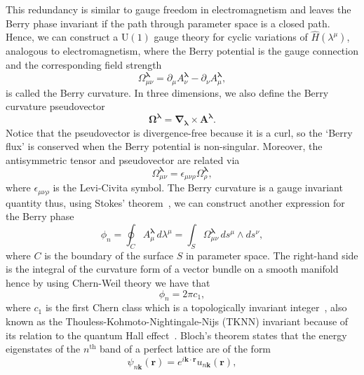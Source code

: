 \documentclass[11pt, a4paper]{article}
\begin{document}
This redundancy is similar to gauge freedom in electromagnetism and
leaves the Berry phase invariant if the path through parameter space is a closed path.
Hence, we can construct a $\mathrm{U(1)}$ gauge theory for cyclic variations of
$\widehat{H}(\lambda^\mu)$, analogous to electromagnetism,
where the Berry potential is the gauge connection and the corresponding
field strength
\begin{equation}
  \Omega^{\bm{\lambda}}_{\mu\nu} = \partial_\mu A^{\bm{\lambda}}_\nu -
  \partial_\nu A^{\bm{\lambda}}_\mu,
\end{equation}
is called the Berry curvature. In three dimensions, we also define the Berry curvature
pseudovector
\begin{equation}\label{eq:3}
  \bm{\Omega^\lambda} = \bm{\nabla_{\!\lambda}\!\times} \bm{A^\lambda}.
\end{equation}
Notice that the pseudovector is divergence-free because it is a curl, so the `Berry flux'
is conserved when the Berry potential is non-singular.
Moreover, the antisymmetric tensor and pseudovector are related via
\begin{equation}
  \Omega^{\bm{\lambda}}_{\mu\nu} = \epsilon_{\mu\nu\rho} \Omega^{\bm{\lambda}}_{\rho},
\end{equation}
where $\epsilon_{\mu\nu\rho}$ is the Levi-Civita symbol.
The Berry curvature is a gauge invariant quantity thus, using Stokes' theorem~\cite{StokesThrm},
we can construct another expression for the Berry phase
\begin{equation}
  \phi_n = \oint_C{A^{\bm{\lambda}}_\mu\,d\lambda^\mu} =
  \int_S{\Omega^{\bm{\lambda}}_{\mu\nu}\,ds^\mu\wedge ds^\nu},
\end{equation}
where $C$ is the boundary of the surface $S$ in parameter space. The right-hand side
is the integral of the curvature form of a vector bundle on a
smooth manifold hence by using Chern-Weil theory
we have that
\begin{equation}
  \phi_n = 2\pi c_1,
\end{equation}
where $c_1$ is the first Chern class which is a topologically
invariant integer~\cite{Chern},
also known as the Thouless-Kohmoto-Nightingale-Nijs (TKNN) invariant because of its relation to
the quantum Hall effect~\cite{TKNN}.
Bloch's theorem states that the energy eigenstates of the
$n^\text{th}$ band of a perfect lattice are of the form
\begin{equation}
  \psi_{n\bm{k}}(\bm{r}) = e^{i\bm{k}\cdot\bm{r}}u_{n\bm{k}}(\bm{r}),
\end{equation}
\end{document}
